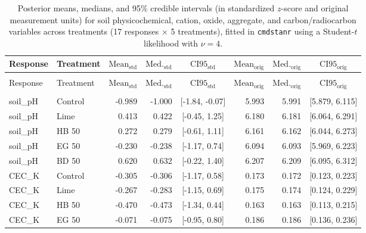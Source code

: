 \documentclass[preprint,12pt]{elsarticle}
\begin{document}
\begin{landscape}
    
\setlength{\LTcapwidth}{\textwidth}
\begin{longtable}{@{} >{\raggedright\arraybackslash}p{4.3cm} l r r c r r c @{}}
\caption{Posterior means, medians, and 95\% credible intervals (in standardized $z$-score and original measurement units) for soil physicochemical, cation, oxide, aggregate, and carbon/radiocarbon variables across treatments (17 responses $\times$ 5 treatments), fitted in \texttt{cmdstanr} using a Student-$t$ likelihood with $\nu = 4$.}
\label{tab:geochem_means_sub} \\
\toprule
Response & Treatment & $\text{Mean}_{\text{std}}$ & $\text{Med.}_{\text{std}}$ & $\text{CI95}_{\text{std}}$ & $\text{Mean}_{\text{orig}}$ & $\text{Med.}_{\text{orig}}$ & $\text{CI95}_{\text{orig}}$ \\
\midrule
\endfirsthead
\multicolumn{8}{@{}l@{}}{\textit{\tablename\ \thetable{} -- continued from previous page}} \\[0.5ex]
\toprule
Response & Treatment & $\text{Mean}_{\text{std}}$ & $\text{Med.}_{\text{std}}$ & $\text{CI95}_{\text{std}}$ & $\text{Mean}_{\text{orig}}$ & $\text{Med.}_{\text{orig}}$ & $\text{CI95}_{\text{orig}}$ \\
\midrule
\endhead
\midrule
\multicolumn{8}{r@{}}{\textit{Continued on next page}} \\
\endfoot
\bottomrule
\endlastfoot
soil\_pH & Control & -0.989 & -1.000 & [-1.84, -0.07] & 5.993 & 5.991 & [5.879, 6.115] \\
soil\_pH & Lime & 0.413 & 0.422 & [-0.45, 1.25] & 6.180 & 6.181 & [6.064, 6.291] \\
soil\_pH & HB 50 & 0.272 & 0.279 & [-0.61, 1.11] & 6.161 & 6.162 & [6.044, 6.273] \\
soil\_pH & EG 50 & -0.230 & -0.238 & [-1.17, 0.74] & 6.094 & 6.093 & [5.969, 6.223] \\
soil\_pH & BD 50 & 0.620 & 0.632 & [-0.22, 1.40] & 6.207 & 6.209 & [6.095, 6.312] \\
CEC\_K & Control & -0.305 & -0.306 & [-1.17, 0.58] & 0.173 & 0.172 & [0.123, 0.223] \\
CEC\_K & Lime & -0.267 & -0.283 & [-1.15, 0.69] & 0.175 & 0.174 & [0.124, 0.229] \\
CEC\_K & HB 50 & -0.470 & -0.473 & [-1.34, 0.44] & 0.163 & 0.163 & [0.113, 0.215] \\
CEC\_K & EG 50 & -0.071 & -0.075 & [-0.95, 0.80] & 0.186 & 0.186 & [0.136, 0.236] \\

\end{longtable}
\end{landscape}
\end{document}
